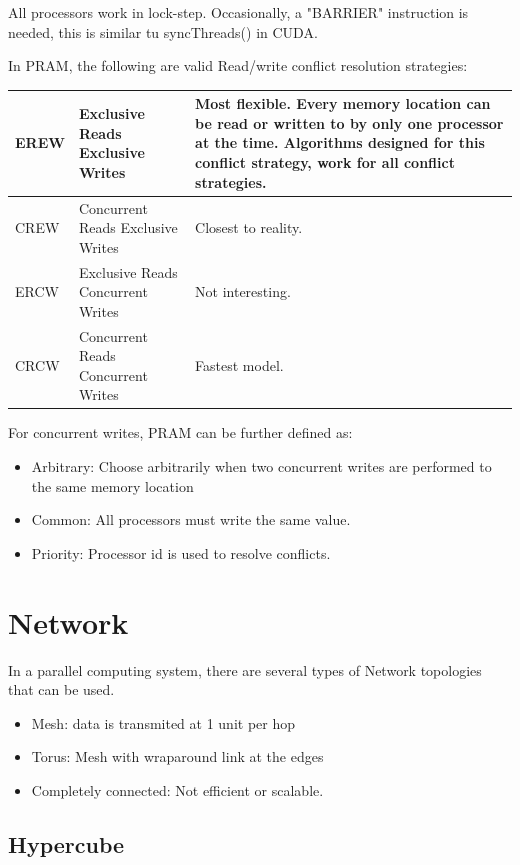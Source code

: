 \documentclass[twoside]{article}
\begin{document}
All processors work in lock-step. Occasionally, a "BARRIER" instruction
is needed, this is similar tu syncThreads() in CUDA.

In PRAM, the following are valid Read/write conflict resolution strategies:

\begin{tabular}{|l|l|p{8cm}|}
	\hline
	EREW & Exclusive Reads Exclusive Writes & Most flexible. Every memory location can be read or written to by only one processor at the time. Algorithms designed for this conflict strategy, work for all conflict strategies. \\ \hline
	CREW & Concurrent Reads Exclusive Writes & Closest to reality. \\ \hline
	ERCW & Exclusive Reads Concurrent Writes & Not interesting. \\  \hline
	CRCW & Concurrent Reads Concurrent Writes & Fastest model. \\ \hline
\end{tabular}

For concurrent writes, PRAM can be further defined as:
\begin{itemize}
	\item Arbitrary: Choose arbitrarily when two concurrent writes are performed to the same memory location
	\item Common: All processors must write the same value.
	\item Priority: Processor id is used to resolve conflicts.
\end{itemize}

\section{Network}

In a parallel computing system, there are several types of Network topologies that
can be used.

\begin{itemize}
 \item Mesh: data is transmited at 1 unit per hop
 \item Torus: Mesh with wraparound link at the edges
 \item Completely connected: Not efficient or scalable.
\end{itemize}

\subsection{Hypercube}
\end{document}
